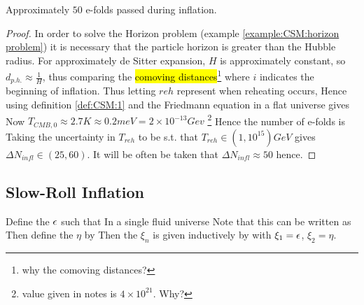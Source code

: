 \documentclass{article}
\begin{document}
\begin{prop}
Approximately $50$ e-folds passed during inflation. 
\end{prop}
\begin{proof}
In order to solve the Horizon problem (example \ref{example:CSM:horizon problem}) it is necessary that the particle horizon is greater than the Hubble radius. For approximately de Sitter expansion, $H$ is approximately constant, so $d_{p.h.}\approx \frac{1}{H}$, thus comparing the \hl{comoving distances}\footnote{why the comoving distances?} 
where $i$ indicates the beginning of inflation. Thus letting $reh$ represent when reheating occurs, 
Hence using definition \ref{def:CSM:1} and the Friedmann equation in a flat universe 
gives 
Now $T_{CMB,0} \approx 2.7K \approx 0.2 meV = 2 \times 10^{-13} Gev $
\footnote{value given in notes is $4\times 10^{21}$. Why?}
Hence the number of e-folds is 
Taking the uncertainty in $T_{reh}$ to be s.t. that $T_{reh} \in (1,10^{15}) GeV$ gives $\Delta N_{infl} \in (25,60)$. It will be often be taken that $\Delta N_{infl} \approx 50$ hence. 
\end{proof}

\subsection{Slow-Roll Inflation}

\begin{definition}
Define the  $\epsilon$ such that 
In a single fluid universe 
Note that this can be written as 
Then define the  $\eta$ by 
Then the  $\xi_n$ is given inductively by 
with $\xi_1 = \epsilon$, $\xi_2 = \eta$. 
\end{definition}
\end{document}
